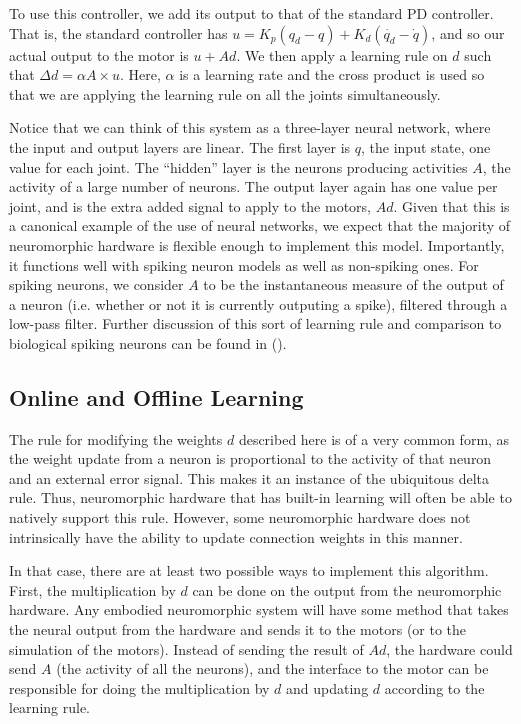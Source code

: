\documentclass{frontiersSCNS} %
\begin{document}
To use this controller, we add its output to that of the standard PD controller.
That is, the standard controller has $u=K_p(q_d - q) + K_d(\dot{q_d} - \dot{q})$,
and so our actual output to the motor is $u + Ad$.  We then apply a learning
rule on $d$ such that $\Delta d = \alpha A \times u$.  Here, $\alpha$ is a learning
rate and the cross product is used so that we are applying the learning rule
on all the joints simultaneously.

Notice that we can think of this system as a three-layer neural
network, where the input and output layers are linear.  The first layer is $q$, the input state, one value for each joint.  The ``hidden'' layer
is the neurons producing activities $A$, the activity of a large number of neurons.  The output layer again has
one value per joint, and is the extra added signal to apply to the motors, $Ad$.
Given that this is a canonical example of the use of neural networks, we
expect that the majority of neuromorphic hardware is flexible enough to implement
this model.  Importantly, it functions well with spiking neuron models as 
well as non-spiking ones.  For spiking neurons, we consider $A$ to be the
instantaneous measure of the output of a neuron (i.e. whether or not it is currently outputing a spike),
filtered through a low-pass filter.  Further discussion of this sort of learning
rule and comparison to biological spiking neurons can be found in (\citealt{bekolay2013}).


\subsection{Online and Offline Learning}

The rule for modifying the weights $d$ described here is
of a very common form, as the weight
update from a neuron is proportional to the activity of that neuron and an
external error signal.  This makes it an instance of the ubiquitous delta rule.
Thus, neuromorphic hardware that has built-in learning will often be able to natively support this rule.
However, some neuromorphic hardware does not intrinsically have
the ability to update connection weights in this manner.

In that case, there are at least two possible ways to implement this algorithm.
First, the multiplication by $d$ can be done on the
output from the neuromorphic hardware.  Any embodied neuromorphic system will have some method that takes
the neural output from the hardware and sends it to the motors (or to the simulation
of the motors).  Instead of sending the result of $Ad$, the hardware could
send $A$ (the activity of all the neurons), and the interface to the motor
can be responsible for doing the multiplication by $d$ and updating $d$
according to the learning rule.
\end{document}
